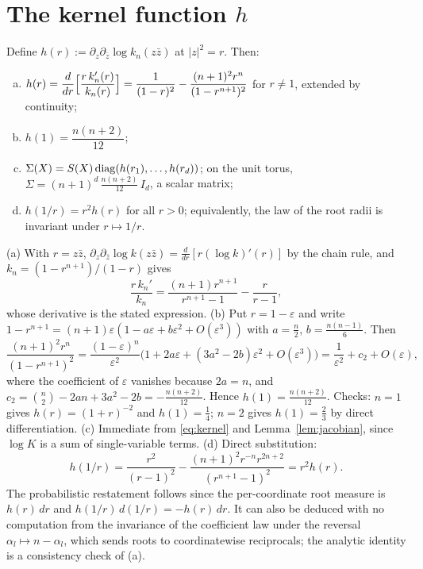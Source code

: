 \section{The kernel function $h$}\label{sec:kernelh}

\begin{lemma}\label{lem:h}
  Define $h(r) := \partial_z\partial_{\bar z}\log k_n(z\bar z)$ at $|z|^2=r$. Then:
  \begin{enumerate}[(a)]
    \item $h(r) = \dfrac{d}{dr}\Bigl[\dfrac{r\,k_n'(r)}{k_n(r)}\Bigr]
      = \dfrac{1}{(1-r)^2} - \dfrac{(n+1)^2r^n}{(1-r^{n+1})^2}$ for $r\ne1$, extended by
      continuity;
    \item $h(1) = \dfrac{n(n+2)}{12}$;
    \item $\Sigma(X) = S(X)\operatorname{diag}(h(r_1),\dots,h(r_d))$; on the unit torus,
      $\Sigma = (n+1)^d\,\frac{n(n+2)}{12}\,I_d$, a scalar matrix;
    \item $h(1/r) = r^2h(r)$ for all $r>0$; equivalently, the law of the root radii is
      invariant under $r\mapsto1/r$.
  \end{enumerate}
\end{lemma}

\proof
(a) With $r=z\bar z$, $\partial_z\partial_{\bar z}\log k(z\bar z) =
\frac{d}{dr}[r(\log k)'(r)]$ by the chain rule, and $k_n = (1-r^{n+1})/(1-r)$ gives
\[
  \frac{r\,k_n'}{k_n} = \frac{(n+1)r^{n+1}}{r^{n+1}-1} - \frac{r}{r-1},
\]
whose derivative is the stated expression. (b) Put $r=1-\varepsilon$ and write
$1-r^{n+1} = (n+1)\varepsilon(1-a\varepsilon+b\varepsilon^2+O(\varepsilon^3))$ with
$a=\frac n2$, $b=\frac{n(n-1)}6$. Then
\[
  \frac{(n+1)^2r^n}{(1-r^{n+1})^2}
  = \frac{(1-\varepsilon)^n}{\varepsilon^2}
    \bigl(1+2a\varepsilon+(3a^2-2b)\varepsilon^2+O(\varepsilon^3)\bigr)
  = \frac1{\varepsilon^2} + c_2 + O(\varepsilon),
\]
where the coefficient of $\varepsilon$ vanishes because $2a=n$, and
$c_2 = \binom n2 - 2an + 3a^2 - 2b = -\frac{n(n+2)}{12}$. Hence $h(1)=\frac{n(n+2)}{12}$.
Checks: $n=1$ gives $h(r) = (1+r)^{-2}$ and $h(1)=\frac14$; $n=2$ gives $h(1)=\frac23$ by
direct differentiation. (c) Immediate from \eqref{eq:kernel} and Lemma~\ref{lem:jacobian},
since $\log K$ is a sum of single-variable terms. (d) Direct substitution:
\[
  h(1/r) = \frac{r^2}{(r-1)^2} - \frac{(n+1)^2r^{-n}r^{2n+2}}{(r^{n+1}-1)^2} = r^2h(r).
\]
The probabilistic restatement follows since the per-coordinate root measure is $h(r)\,dr$ and
$h(1/r)\,d(1/r) = -h(r)\,dr$. It can also be deduced with no computation from the invariance
of the coefficient law under the reversal $\alpha_l\mapsto n-\alpha_l$, which sends roots to
coordinatewise reciprocals; the analytic identity is a consistency check of (a).
\endproof
